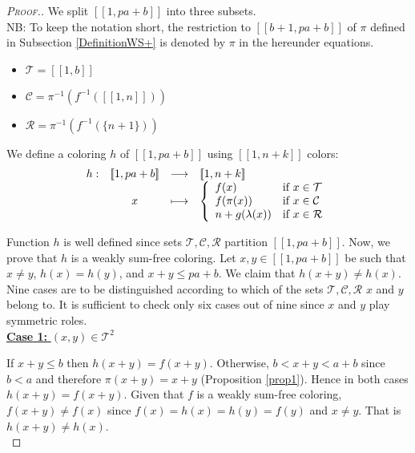 \begin{proof}[\textsc{Proof.}]
We split \([\![1, p a + b]\!]\) into three subsets. \\
NB: To keep the notation short, the restriction to \([\![b + 1, p a + b]\!]\) of \(\pi\) defined in Subsection \ref{DefinitionWS+}
is denoted by \(\pi\) in the hereunder equations.

\begin{itemize}
	\item \(\mathcal{T} = [\![1, b]\!]\)
	\item \(\mathcal{C} = \pi^{-1}(f^{-1}([\![1, n]\!]))\)
	\item \(\mathcal{R} = \pi^{-1}(f^{-1}(\{n + 1\}))\)
\end{itemize}

We define a coloring \(h\) of \([\![1, p a + b]\!]\) using \( [\![1,n+k]\!]\) colors:
\[
\begin{array}{c c c l}
	h : & [\![1, p a + b]\!] & \longrightarrow & [\![1,n+k]\!] \\
	& x & \longmapsto &
	\left\{ \begin{array}{l l}
		f(x) & \text{if}~x \in \mathcal{T} \\
		f(\pi(x)) & \text{if}~x \in \mathcal{C} \\
		n + g(\lambda(x)) & \text{if}~x \in \mathcal{R}
	\end{array} \right.
\end{array}
\]

Function \(h\) is well defined since sets \(\mathcal{T}, \mathcal{C}, \mathcal{R}\) partition \([\![1, p a + b]\!]\).
Now, we prove that \(h\) is a weakly sum-free coloring. Let \(x,y \in [\![1, p a + b]\!]\) be such that \(x \neq y\),
\(h(x) = h(y)\), and \(x+y \leqslant p a+ b\). We claim that \(h(x+y) \neq h(x)\). Nine cases are to be distinguished
according to which of the sets \(\mathcal{T}, \mathcal{C}, \mathcal{R}\) \(x\) and \(y\) belong to. It is
sufficient to check only six cases out of nine since \(x\) and \(y\) play symmetric roles. \\

\noindent \underline{\textbf{Case 1:} \((x,y) \in \mathcal{T}^2\)}
\par
If \(x + y \leqslant b\) then \(h(x+y)=f(x+y)\). Otherwise, \(b < x+y < a+b\) since \(b < a\) and
therefore \(\pi(x + y) = x +y\) (Proposition \ref{prop1}). Hence in both cases \(h(x+y)=f(x+y)\). Given that
\(f\) is a weakly sum-free coloring, \(f(x + y) \neq f(x)\) since \(f(x)=h(x)=h(y)=f(y)\) and \(x \neq y \). That
is \(h(x + y) \neq h(x)\). \\


\end{proof}
